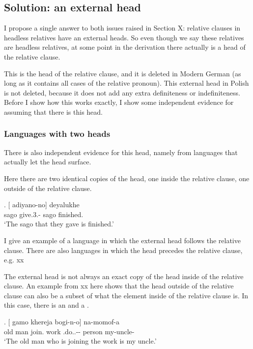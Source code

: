 \subsection{Solution: an external head}

I propose a single answer to both issues raised in Section X: relative clauses in headless relatives have an external heads. So even though we say these relatives are headless relatives, at some point in the derivation there actually is a head of the relative clause.

This is the head of the relative clause, and it is deleted in Modern German (as long as it contains all cases of the relative pronoun). This external head in Polish is not deleted, because it does not add any extra definiteness or indefiniteness. Before I show how this works exactly, I show some independent evidence for assuming that there is this head.


\subsubsection{Languages with two heads}

There is also independent evidence for this head, namely from languages that actually let the head surface.

Here there are two identical copies of the head, one inside the relative clause, one outside of the relative clause.

\exg. [ adiyano-no]  deyalukhe\\
 sago give.3.- sago finished.\\
 `The sago that they gave is finished.' 

I give an example of a language in which the external head follows the relative clause. There are also languages in which the head precedes the relative clause, e.g. xx

The external head is not always an exact copy of the head inside of the relative clause. An example from xx here shows that the head outside of the relative clause can also be a subset of what the element inside of the relative clause is. In this case, there is an  and a .

\exg. [ gamo khereja bogi-n-o]  na-momof-a\\
 {old man} join. work .do..-- person my-uncle-\\
 `The old man who is joining the work is my uncle.'


